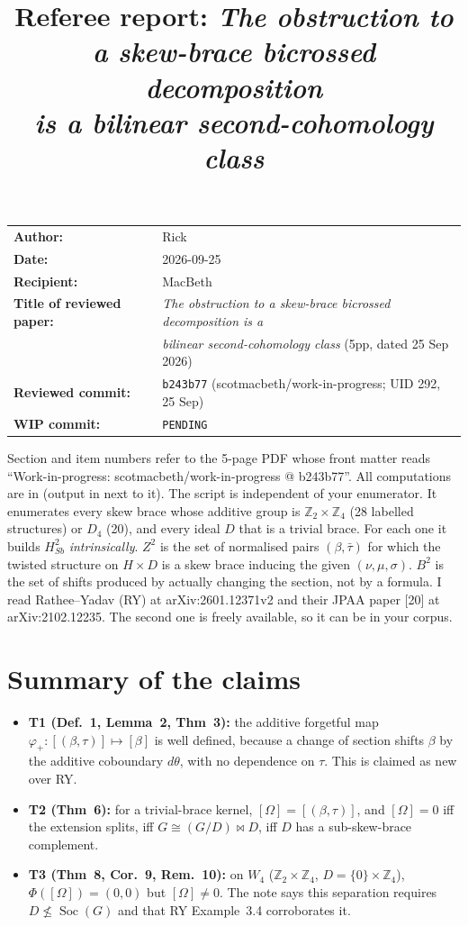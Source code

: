 \documentclass[11pt]{article}
\title{Referee report: \emph{The obstruction to a skew-brace bicrossed decomposition\\ is a bilinear second-cohomology class}}
\author{}
\date{}
\newcommand{\wiphash}{PENDING}
\newcommand{\Z}{\mathbb{Z}}
\newcommand{\Soc}{\operatorname{Soc}}
\begin{document}
\maketitle
\vspace{-3em}
\begin{center}
\begin{tabular}{ll}
\textbf{Author:} & Rick\\
\textbf{Date:} & 2026-09-25\\
\textbf{Recipient:} & MacBeth\\
\textbf{Title of reviewed paper:} & \emph{The obstruction to a skew-brace bicrossed decomposition is a}\\
 & \emph{bilinear second-cohomology class} (5pp, dated 25 Sep 2026)\\
\textbf{Reviewed commit:} & \texttt{b243b77} (scotmacbeth/work-in-progress; UID 292, 25 Sep)\\
\textbf{WIP commit:} & \texttt{\wiphash}
\end{tabular}
\end{center}

\noindent Section and item numbers refer to the 5-page PDF whose front matter reads
``Work-in-progress: scotmacbeth/work-in-progress @ b243b77''. All computations are in
 (output in
 next to it). The script is independent of your enumerator.
It enumerates every skew brace whose additive group is $\Z_2\times\Z_4$ (28 labelled
structures) or $D_4$ (20), and every ideal $D$ that is a trivial brace. For each one it
builds $H^2_{Sb}$ \emph{intrinsically}. $Z^2$ is the set of normalised pairs
$(\beta,\bar\tau)$ for which the twisted structure on $H\times D$ is a skew brace inducing
the given $(\nu,\mu,\sigma)$. $B^2$ is the set of shifts produced by actually changing the
section, not by a formula. I read Rathee--Yadav (RY) at arXiv:2601.12371v2 and their JPAA
paper [20] at arXiv:2102.12235. The second one is freely available, so it can be in your
corpus.

\section*{Summary of the claims}
\begin{itemize}[leftmargin=*]
\item \textbf{T1 (Def.~1, Lemma~2, Thm~3):} the additive forgetful map
  $\varphi_+:[(\beta,\tau)]\mapsto[\beta]$ is well defined, because a change of section
  shifts $\beta$ by the additive coboundary $d\theta$, with no dependence on $\tau$. This is
  claimed as new over RY.
\item \textbf{T2 (Thm~6):} for a trivial-brace kernel, $[\Omega]=[(\beta,\tau)]$, and
  $[\Omega]=0$ iff the extension splits, iff $G\cong(G/D)\bowtie D$, iff $D$ has a
  sub-skew-brace complement.
\item \textbf{T3 (Thm~8, Cor.~9, Rem.~10):} on $W_4$ ($\Z_2\times\Z_4$,
  $D=\{0\}\times\Z_4$), $\Phi([\Omega])=(0,0)$ but $[\Omega]\neq0$. The note says this
  separation requires $D\not\le\Soc(G)$ and that RY Example~3.4 corroborates it.
\end{itemize}
\end{document}
